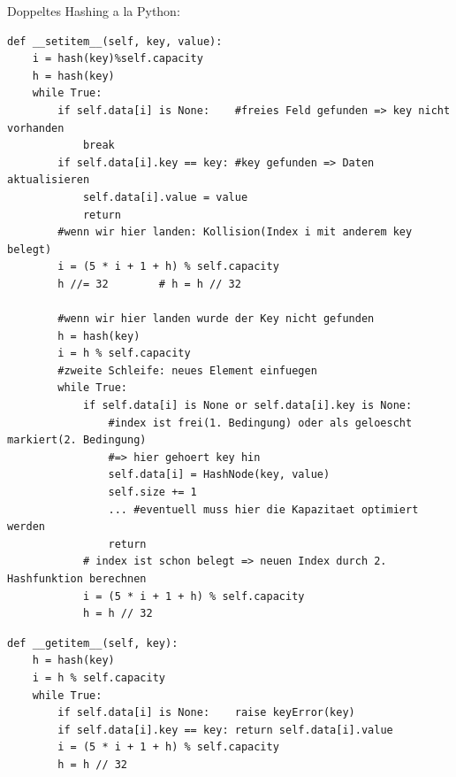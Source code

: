 Doppeltes Hashing a la Python:
\begin{verbatim}
def __setitem__(self, key, value):
    i = hash(key)%self.capacity
    h = hash(key)
    while True:
        if self.data[i] is None:    #freies Feld gefunden => key nicht vorhanden
            break
        if self.data[i].key == key: #key gefunden => Daten aktualisieren
            self.data[i].value = value
            return
        #wenn wir hier landen: Kollision(Index i mit anderem key belegt)
        i = (5 * i + 1 + h) % self.capacity
        h //= 32        # h = h // 32

        #wenn wir hier landen wurde der Key nicht gefunden
        h = hash(key)
        i = h % self.capacity
        #zweite Schleife: neues Element einfuegen
        while True:
            if self.data[i] is None or self.data[i].key is None:
                #index ist frei(1. Bedingung) oder als geloescht markiert(2. Bedingung)
                #=> hier gehoert key hin
                self.data[i] = HashNode(key, value)
                self.size += 1
                ... #eventuell muss hier die Kapazitaet optimiert werden
                return
            # index ist schon belegt => neuen Index durch 2. Hashfunktion berechnen
            i = (5 * i + 1 + h) % self.capacity
            h = h // 32
\end{verbatim}

\begin{verbatim}
def __getitem__(self, key):
    h = hash(key)
    i = h % self.capacity
    while True:
        if self.data[i] is None:    raise keyError(key)
        if self.data[i].key == key: return self.data[i].value
        i = (5 * i + 1 + h) % self.capacity
        h = h // 32
\end{verbatim}


